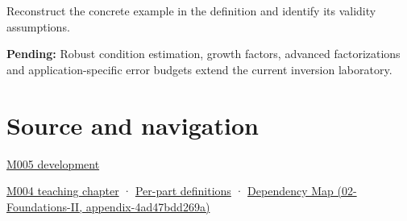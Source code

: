 Reconstruct the concrete example in the definition and identify its validity assumptions.

\textbf{Pending:} Robust condition estimation, growth factors, advanced factorizations and application-specific error budgets extend the current inversion laboratory.

\section{Source and navigation}\label{appendix-8f6a01f284a7-source-and-navigation}

\href{Continuous\%20Notes/Computing\%20Foundations\%20-\%20From\%20Bits\%20to\%20C++\%20and\%20Systems\%20APIs\#When\%20arithmetic\%20meets\%20uncertainty}{M005 development}

\href{Continuous\%20Notes/Computing\%20Foundations\%20-\%20From\%20Bits\%20to\%20C++\%20and\%20Systems\%20APIs\#A\%20stretching\%20ruler\%20for\%20real-valued\%20quantities}{M004 teaching chapter} · \hyperref[appendix-fd090d982a15-m004---parts-61-76]{Per-part definitions} · \href{../02-Foundations-II/main.pdf\#nameddest=appendix-4ad47bdd269a}{Dependency Map (02-Foundations-II, appendix-4ad47bdd269a)}
